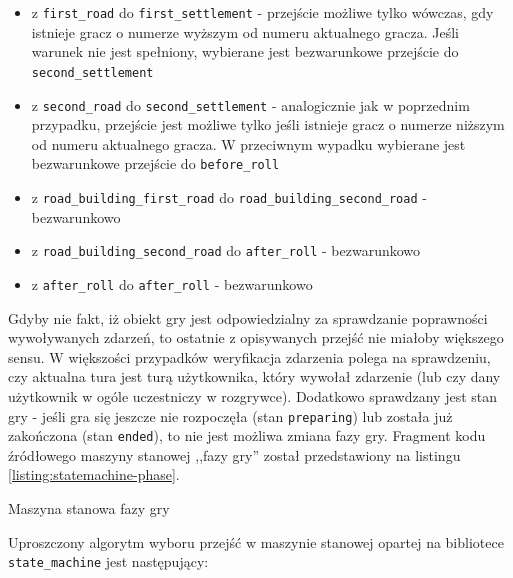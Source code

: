 \documentclass[a4paper,12pt]{article}
\begin{document}
\begin{itemize}
\item z \texttt{first\_road} do \texttt{first\_settlement} - przejście
  możliwe tylko wówczas, gdy istnieje gracz o numerze wyższym od
  numeru aktualnego gracza. Jeśli warunek nie jest spełniony,
  wybierane jest bezwarunkowe przejście do \texttt{second\_settlement}
\item z \texttt{second\_road} do \texttt{second\_settlement} -
  analogicznie jak w poprzednim przypadku, przejście jest możliwe tylko
  jeśli istnieje gracz o numerze niższym od numeru aktualnego
  gracza. W przeciwnym wypadku wybierane jest bezwarunkowe przejście
  do \texttt{before\_roll}
\item z \texttt{road\_building\_first\_road} do
  \texttt{road\_building\_second\_road} - bezwarunkowo
\item z \texttt{road\_building\_second\_road} do \texttt{after\_roll}
  - bezwarunkowo
\item z \texttt{after\_roll} do \texttt{after\_roll} - bezwarunkowo
\end{itemize}

Gdyby nie fakt, iż obiekt gry jest odpowiedzialny za sprawdzanie
poprawności wywoływanych zdarzeń, to ostatnie z opisywanych przejść
nie miałoby większego sensu. W większości przypadków weryfikacja
zdarzenia polega na sprawdzeniu, czy aktualna tura jest turą
użytkownika, który wywołał zdarzenie (lub czy dany użytkownik w ogóle
uczestniczy w rozgrywce). Dodatkowo sprawdzany jest stan gry - jeśli
gra się jeszcze nie rozpoczęła (stan \texttt{preparing}) lub została
już zakończona (stan \texttt{ended}), to nie jest możliwa zmiana fazy
gry. Fragment kodu źródłowego maszyny stanowej ,,fazy gry'' został
przedstawiony na listingu \ref{listing:statemachine-phase}.

\begin{listing}
  
  \caption{Maszyna stanowa fazy gry}
  \label{listing:statemachine-phase}
\end{listing}

Uproszczony algorytm wyboru przejść w maszynie stanowej opartej na
bibliotece \texttt{state\_machine} jest następujący:
\end{document}
